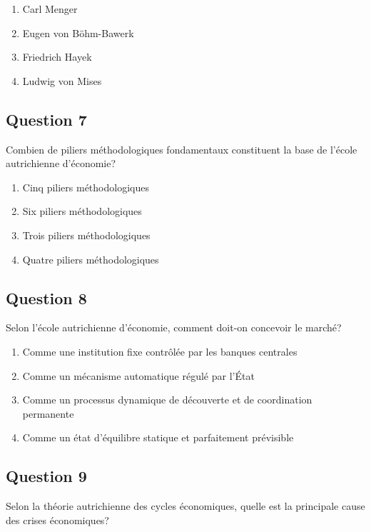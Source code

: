 \documentclass[12pt,a4paper]{article}
\begin{document}
\begin{enumerate}[label=\Alph*., leftmargin=*]
\item Carl Menger
\item Eugen von Böhm-Bawerk
\item Friedrich Hayek
\item Ludwig von Mises
\end{enumerate}

\bigskip


\subsection*{Question 7}
Combien de piliers méthodologiques fondamentaux constituent la base de l'école autrichienne d'économie?

\begin{enumerate}[label=\Alph*., leftmargin=*]
\item Cinq piliers méthodologiques
\item Six piliers méthodologiques
\item Trois piliers méthodologiques
\item Quatre piliers méthodologiques
\end{enumerate}

\bigskip


\subsection*{Question 8}
Selon l'école autrichienne d'économie, comment doit-on concevoir le marché?

\begin{enumerate}[label=\Alph*., leftmargin=*]
\item Comme une institution fixe contrôlée par les banques centrales
\item Comme un mécanisme automatique régulé par l'État
\item Comme un processus dynamique de découverte et de coordination permanente
\item Comme un état d'équilibre statique et parfaitement prévisible
\end{enumerate}

\bigskip


\subsection*{Question 9}
Selon la théorie autrichienne des cycles économiques, quelle est la principale cause des crises économiques?
\end{document}
